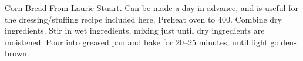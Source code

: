 \begin{recipe}{Corn Bread}{}{}
\freeform From Laurie Stuart.  Can be made a day in advance, and is useful for the dressing/stuffing recipe included here.
\newstep Preheat oven to 400\0.
Combine dry ingredients.
Stir in wet ingredients, mixing just until dry ingredients are moistened.  Pour into greased pan and bake for 20--25 minutes, until light golden-brown.
\end{recipe}
